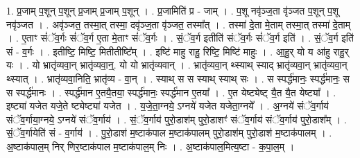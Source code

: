 \documentclass[17pt]{extarticle}
\begin{document}
1. प्र॒जाम् प॒शून् प॒शून् प्र॒जाम् प्र॒जाम् प॒शून् । . प्र॒जामिति॑ प्र - जाम् । . प॒शू नवृ॑ञ्ज॒ता वृ॑ञ्जत प॒शून् प॒शू नवृ॑ञ्जत । . अवृ॑ञ्जत॒ तस्मा॒त् तस्मा॒ दवृ॑ञ्ज॒ता वृ॑ञ्जत॒ तस्मा᳚त् । . तस्मा॑ दे॒ता मे॒ताम् तस्मा॒त् तस्मा॑ दे॒ताम् । . ए॒ताꣳ सं॑ॅव॒र्गः सं॑ॅव॒र्ग ए॒ता मे॒ताꣳ सं॑ॅव॒र्गः । . सं॒ॅव॒र्ग इतीति॑ संॅव॒र्गः सं॑ॅव॒र्ग इति॑ । . सं॒ॅव॒र्ग इति॑ सं - व॒र्गः । . इतीष्टि॒ मिष्टि॒ मितीतीष्टि᳚म् । . इष्टि॑ माहु राहु॒ रिष्टि॒ मिष्टि॑ माहुः । . आ॒हु॒र् यो य आ॑हु राहु॒र् यः । . यो भ्रातृ॑व्यवा॒न् भ्रातृ॑व्यवा॒न्॒. यो यो भ्रातृ॑व्यवान् । . भ्रातृ॑व्यवा॒न् थ्स्याथ् स्याद् भ्रातृ॑व्यवा॒न् भ्रातृ॑व्यवा॒न् थ्स्यात् । . भ्रातृ॑व्यवा॒निति॒ भ्रातृ॑व्य - वा॒न् । . स्याथ् स स स्याथ् स्याथ् सः । . स स्पर्द्ध॑मानः॒ स्पर्द्ध॑मानः॒ स स स्पर्द्ध॑मानः । . स्पर्द्ध॑मान ए॒तयै॒तया॒ स्पर्द्ध॑मानः॒ स्पर्द्ध॑मान ए॒तया᳚ । . ए॒त येष्ट्येष्ट् यै॒त यै॒त येष्ट्या᳚ । . इष्ट्या॑ यजेत यजे॒ते ष्ट्येष्ट्या॑ यजेत । . य॒जे॒ता॒ग्नये॒ ऽग्नये॑ यजेत यजेता॒ग्नये᳚ । . अ॒ग्नये॑ संॅव॒र्गाय॑ संॅव॒र्गाया॒ग्नये॒ ऽग्नये॑ संॅव॒र्गाय॑ । . सं॒ॅव॒र्गाय॑ पुरो॒डाश॑म् पुरो॒डाशꣳ॑ संॅव॒र्गाय॑ संॅव॒र्गाय॑ पुरो॒डाश᳚म् । . सं॒ॅव॒र्गायेति॑ सं - व॒र्गाय॑ । . पु॒रो॒डाश॑ म॒ष्टाक॑पाल म॒ष्टाक॑पालम् पुरो॒डाश॑म् पुरो॒डाश॑ म॒ष्टाक॑पालम् । . अ॒ष्टाक॑पाल॒म् निर् णिर॒ष्टाक॑पाल म॒ष्टाक॑पाल॒म् निः । . अ॒ष्टाक॑पाल॒मित्य॒ष्टा - क॒पा॒ल॒म् । \newline
\end{document}
